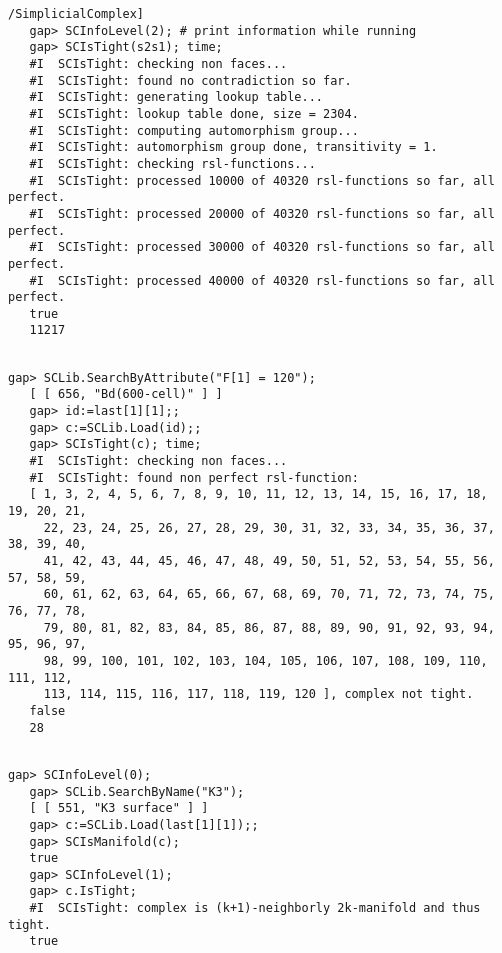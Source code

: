 \documentclass[a4paper,11pt]{report}
\begin{document}
{{{\begin{Verbatim}[commandchars=!@|,fontsize=\small,frame=single,label=Example]
   /SimplicialComplex]
   gap> SCInfoLevel(2); # print information while running
   gap> SCIsTight(s2s1); time;
   #I  SCIsTight: checking non faces...
   #I  SCIsTight: found no contradiction so far.
   #I  SCIsTight: generating lookup table...
   #I  SCIsTight: lookup table done, size = 2304.
   #I  SCIsTight: computing automorphism group...
   #I  SCIsTight: automorphism group done, transitivity = 1.
   #I  SCIsTight: checking rsl-functions...
   #I  SCIsTight: processed 10000 of 40320 rsl-functions so far, all perfect.
   #I  SCIsTight: processed 20000 of 40320 rsl-functions so far, all perfect.
   #I  SCIsTight: processed 30000 of 40320 rsl-functions so far, all perfect.
   #I  SCIsTight: processed 40000 of 40320 rsl-functions so far, all perfect.
   true
   11217
   
\end{Verbatim}
 
\begin{Verbatim}[commandchars=!@|,fontsize=\small,frame=single,label=Example]
   gap> SCLib.SearchByAttribute("F[1] = 120");
   [ [ 656, "Bd(600-cell)" ] ]
   gap> id:=last[1][1];;
   gap> c:=SCLib.Load(id);;
   gap> SCIsTight(c); time;
   #I  SCIsTight: checking non faces...
   #I  SCIsTight: found non perfect rsl-function: 
   [ 1, 3, 2, 4, 5, 6, 7, 8, 9, 10, 11, 12, 13, 14, 15, 16, 17, 18, 19, 20, 21, 
     22, 23, 24, 25, 26, 27, 28, 29, 30, 31, 32, 33, 34, 35, 36, 37, 38, 39, 40, 
     41, 42, 43, 44, 45, 46, 47, 48, 49, 50, 51, 52, 53, 54, 55, 56, 57, 58, 59, 
     60, 61, 62, 63, 64, 65, 66, 67, 68, 69, 70, 71, 72, 73, 74, 75, 76, 77, 78, 
     79, 80, 81, 82, 83, 84, 85, 86, 87, 88, 89, 90, 91, 92, 93, 94, 95, 96, 97, 
     98, 99, 100, 101, 102, 103, 104, 105, 106, 107, 108, 109, 110, 111, 112, 
     113, 114, 115, 116, 117, 118, 119, 120 ], complex not tight.
   false
   28
   
\end{Verbatim}
 
\begin{Verbatim}[commandchars=!@|,fontsize=\small,frame=single,label=Example]
   gap> SCInfoLevel(0);
   gap> SCLib.SearchByName("K3");  
   [ [ 551, "K3 surface" ] ]
   gap> c:=SCLib.Load(last[1][1]);;
   gap> SCIsManifold(c);
   true
   gap> SCInfoLevel(1);
   gap> c.IsTight;                 
   #I  SCIsTight: complex is (k+1)-neighborly 2k-manifold and thus tight.
   true
   
\end{Verbatim}
 
}}}
\end{document}
